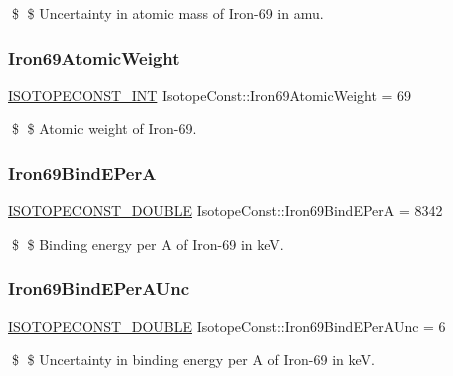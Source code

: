 \$ \$ Uncertainty in atomic mass of Iron-\/69 in amu. \mbox{\label{group___isotope_const-_iron-_fe69_ga00dc515f69ade108a8c647a7ef464e2b}} 
\subsubsection{\texorpdfstring{Iron69\+Atomic\+Weight}{Iron69AtomicWeight}}
{\footnotesize\ttfamily \mbox{\hyperlink{group___isotope_const-_macros_ga5f18360b3e99483a35c32d789e62621c}{I\+S\+O\+T\+O\+P\+E\+C\+O\+N\+S\+T\+\_\+\+I\+NT}} Isotope\+Const\+::\+Iron69\+Atomic\+Weight = 69}

\$ \$ Atomic weight of Iron-\/69. \mbox{\label{group___isotope_const-_iron-_fe69_ga4b0a98bbee2cff1825d06cb8c76ef7f8}} 
\subsubsection{\texorpdfstring{Iron69\+Bind\+E\+PerA}{Iron69BindEPerA}}
{\footnotesize\ttfamily \mbox{\hyperlink{group___isotope_const-_macros_ga8f45a7272ce02c0b4c65c44636ed719a}{I\+S\+O\+T\+O\+P\+E\+C\+O\+N\+S\+T\+\_\+\+D\+O\+U\+B\+LE}} Isotope\+Const\+::\+Iron69\+Bind\+E\+PerA = 8342}

\$ \$ Binding energy per A of Iron-\/69 in keV. \mbox{\label{group___isotope_const-_iron-_fe69_ga8f12ada085f7910133049afe3f4fcb50}} 
\subsubsection{\texorpdfstring{Iron69\+Bind\+E\+Per\+A\+Unc}{Iron69BindEPerAUnc}}
{\footnotesize\ttfamily \mbox{\hyperlink{group___isotope_const-_macros_ga8f45a7272ce02c0b4c65c44636ed719a}{I\+S\+O\+T\+O\+P\+E\+C\+O\+N\+S\+T\+\_\+\+D\+O\+U\+B\+LE}} Isotope\+Const\+::\+Iron69\+Bind\+E\+Per\+A\+Unc = 6}

\$ \$ Uncertainty in binding energy per A of Iron-\/69 in keV. \mbox{\label{group___isotope_const-_iron-_fe69_ga2b1fc466f9bab21f2cb8f18436b79008}} 
